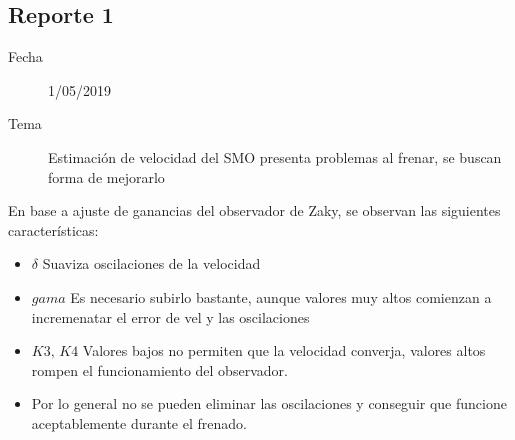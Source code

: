 \documentclass{article}
\begin{document}
		\subsection{Reporte 1}
			\begin{description}
				\item[Fecha]  1/05/2019 
				\item[Tema] Estimación de velocidad del SMO presenta problemas al frenar, se buscan forma de mejorarlo
			\end{description}
		
			En base a ajuste de ganancias del observador de Zaky, se observan las siguientes características:
			
			\begin{itemize}
				\item $\delta$ Suaviza oscilaciones de la velocidad
				\item $gama$ Es necesario subirlo bastante, aunque valores muy altos comienzan a incremenatar el error de vel y las oscilaciones
				\item $K3,\,K4$ Valores bajos no permiten que la velocidad converja, valores altos rompen el funcionamiento del observador.
				\item Por lo general no se pueden eliminar las oscilaciones y conseguir que funcione aceptablemente durante el frenado. 
			\end{itemize}
	
	
	
	
	
	
	
	
\end{document}
